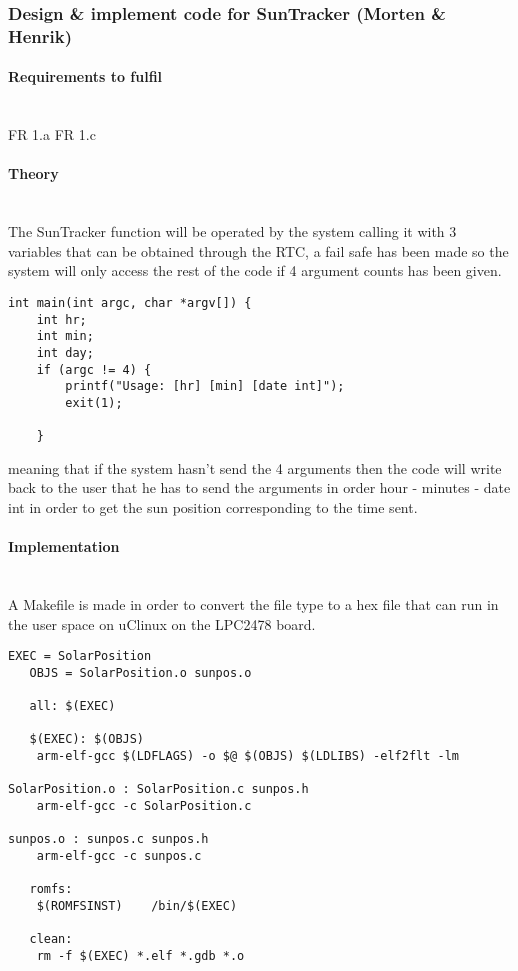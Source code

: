 \subsubsection{Design \& implement code for SunTracker (Morten \& Henrik)}
\paragraph{Requirements to fulfil}\mbox{}\\
FR 1.a
FR 1.c

\paragraph{Theory}\mbox{}\\
The SunTracker function will be operated by the system calling it with 3 variables that can be obtained through the RTC, a fail safe has been made so the system will only access the rest of the code if 4 argument counts has been given.
\begin{verbatim}
int main(int argc, char *argv[]) {
	int hr;
	int min;
	int day;
	if (argc != 4) {
		printf("Usage: [hr] [min] [date int]");
		exit(1);

	}
\end{verbatim}

meaning that if the system hasn't send the 4 arguments then the code will write back to the user that he has to send the arguments in order hour - minutes - date int in order to get the sun position corresponding to the time sent.

\paragraph{Implementation}\mbox{}\\
A Makefile is made in order to convert the file type to a hex file that can run in the user space on uClinux on the LPC2478 board. 
\begin{verbatim}
EXEC = SolarPosition
   OBJS = SolarPosition.o sunpos.o
 
   all: $(EXEC)
 
   $(EXEC): $(OBJS)
	arm-elf-gcc $(LDFLAGS) -o $@ $(OBJS) $(LDLIBS) -elf2flt -lm

SolarPosition.o : SolarPosition.c sunpos.h 
	arm-elf-gcc -c SolarPosition.c
 
sunpos.o : sunpos.c sunpos.h
	arm-elf-gcc -c sunpos.c

   romfs:
	$(ROMFSINST)    /bin/$(EXEC)
 
   clean:
	rm -f $(EXEC) *.elf *.gdb *.o
\end{verbatim}

